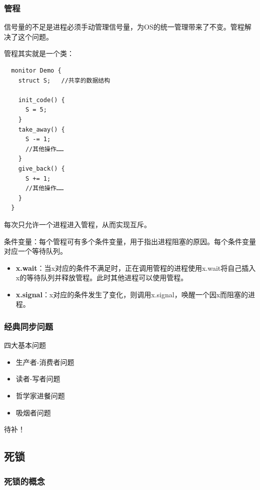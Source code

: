 \documentclass[12pt, a4paper, oneside]{ctexart}
\begin{document}
\subsubsection{管程}

信号量的不足是进程必须手动管理信号量，为OS的统一管理带来了不变。管程解决了这个问题。

管程其实就是一个类：
\begin{lstlisting}
  monitor Demo {
    struct S;   //共享的数据结构
    
    init_code() {
      S = 5;
    }
    take_away() {
      S -= 1;
      //其他操作……
    }
    give_back() {
      S += 1;
      //其他操作……
    }
  }
\end{lstlisting}

每次只允许一个进程进入管程，从而实现互斥。

条件变量：每个管程可有多个条件变量，用于指出进程阻塞的原因。每个条件变量对应一个等待队列。
\begin{itemize}
  \item {\bf x.wait}：当x对应的条件不满足时，正在调用管程的进程使用x.wait将自己插入x的等待队列并释放管程。此时其他进程可以使用管程。
  \item {\bf x.signal}：x对应的条件发生了变化，则调用x.signal，唤醒一个因x而阻塞的进程。
\end{itemize}

\subsubsection{经典同步问题}

四大基本问题
\begin{itemize}
  \item 生产者-消费者问题
  \item 读者-写者问题
  \item 哲学家进餐问题
  \item 吸烟者问题
\end{itemize}

待补！

\subsection{死锁}

\subsubsection{死锁的概念}
\end{document}
